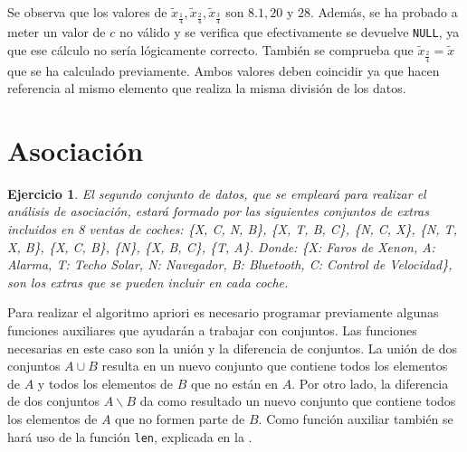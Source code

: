\documentclass[12pt]{report}\usepackage[]{graphicx}\usepackage[dvipsnames]{xcolor}
\newtheorem{exercise}{Ejercicio}[section]
\begin{document}
			Se observa que los valores de $\tilde{x}_{\frac{1}{4}}, \tilde{x}_{\frac{2}{4}}, \tilde{x}_{\frac{3}{4}}$ son $8.1, 20$ y $28$. Además, se ha probado a meter un valor de $c$ no válido y se verifica que efectivamente se devuelve \texttt{NULL}, ya que ese cálculo no sería lógicamente correcto. También se comprueba que $\tilde{x}_{\frac{2}{4}} = \tilde{x}$ que se ha calculado previamente. Ambos valores deben coincidir ya que hacen referencia al mismo elemento que realiza la misma división de los datos.
			
		\section{Asociación}
		
			\begin{exercise}
				El segundo conjunto de datos, que se empleará para realizar el análisis de asociación, estará formado por las siguientes conjuntos de extras incluidos en 8 ventas de coches: \{X, C, N, B\}, \{X, T, B, C\}, \{N, C, X\}, \{N, T, X, B\}, \{X, C, B\}, \{N\}, \{X, B, C\}, \{T, A\}. Donde: \{X: Faros de Xenon, A: Alarma, T: Techo Solar, N: Navegador, B: Bluetooth, C: Control de Velocidad\}, son los extras que se pueden incluir en cada coche.
			\end{exercise}
			
			Para realizar el algoritmo apriori es necesario programar previamente algunas funciones auxiliares que ayudarán a trabajar con conjuntos. Las funciones necesarias en este caso son la unión y la diferencia de conjuntos. La unión de dos conjuntos $A \cup B$ resulta en un nuevo conjunto que contiene todos los elementos de $A$ y todos los elementos de $B$ que no están en $A$. Por otro lado, la diferencia de dos conjuntos $A \backslash B$ da como resultado un nuevo conjunto que contiene todos los elementos de $A$ que no formen parte de $B$. Como función auxiliar también se hará uso de la función \texttt{len}, explicada en la .
			
\end{document}
